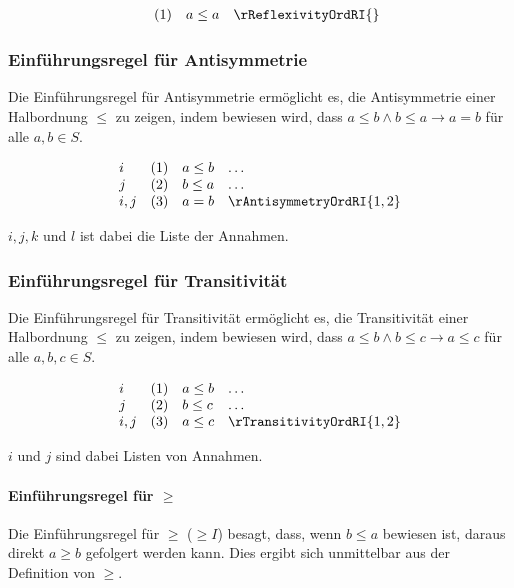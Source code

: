 \documentclass{book}
\theoremstyle{plain}
\theoremstyle{remark}
\theoremstyle{definition}
\begin{document}
\[
\begin{array}{llll}
          & (1) & a \leq a & \rReflexivityOrdRI{}
\end{array}
\]

\subsubsection*{Einführungsregel für Antisymmetrie}
\label{rule:rAntisymmetryOrdRI}
Die Einführungsregel für Antisymmetrie ermöglicht es, die Antisymmetrie einer Halbordnung \(\leq\) zu zeigen, indem bewiesen wird, dass \(a \leq b \land b \leq a \rightarrow a = b\) für alle \(a, b \in S\).

\[
\begin{array}{llll}
    i       & (1) & a \leq b & \dots \\
    j       & (2) & b \leq a & \dots \\
    i,j     & (3) & a = b & \rAntisymmetryOrdRI{1,2}
\end{array}
\]

\(i,j,k\) und \(l\) ist dabei die Liste der Annahmen.

\subsubsection*{Einführungsregel für Transitivität}
\label{rule:rTransitivityOrdRI}
Die Einführungsregel für Transitivität ermöglicht es, die Transitivität einer Halbordnung \(\leq\) zu zeigen, indem bewiesen wird, dass \(a \leq b \land b \leq c \rightarrow a \leq c\) für alle \(a, b, c \in S\).

\[
\begin{array}{llll}
    i           & (1) & a \leq b & \dots \\
    j           & (2) & b \leq c & \dots \\
    i,j         & (3) & a \leq c & \rTransitivityOrdRI{1,2}
\end{array}
\]

\(i\) und \(j\) sind dabei Listen von Annahmen.

\paragraph{Einführungsregel für \(\geq\)}
\label{rule:rgeqI}
Die Einführungsregel für \(\geq\) (\(\geq I\)) besagt, dass, wenn \(b \leq a\) bewiesen ist, daraus direkt \(a \geq b\) gefolgert werden kann. Dies ergibt sich unmittelbar aus der Definition von \(\geq\).
\end{document}
